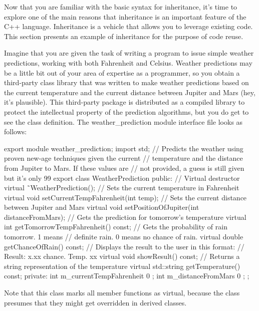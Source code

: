 
Now that you are familiar with the basic syntax for inheritance, it’s time to explore one of the main reasons that inheritance is an important feature of the C++ language. Inheritance is a vehicle that allows you to leverage existing code. This section presents an example of inheritance for the purpose of code reuse.


Imagine that you are given the task of writing a program to issue simple weather predictions, working with both Fahrenheit and Celsius. Weather predictions may be a little bit out of your area of expertise as a programmer, so you obtain a third-party class library that was written to make weather predictions based on the current temperature and the current distance between Jupiter and Mars (hey, it’s plausible). This third-party package is distributed as a compiled library to protect the intellectual property of the prediction algorithms, but you do get to see the class definition. The weather\_prediction module interface file looks as follows:

\begin{cpp}
export module weather_prediction;
import std;
// Predicts the weather using proven new-age techniques given the current
// temperature and the distance from Jupiter to Mars. If these values are
// not provided, a guess is still given but it's only 99%
export class WeatherPrediction
{
    public:
        // Virtual destructor
        virtual ˜WeatherPrediction();
        // Sets the current temperature in Fahrenheit
        virtual void setCurrentTempFahrenheit(int temp);
        // Sets the current distance between Jupiter and Mars
        virtual void setPositionOfJupiter(int distanceFromMars);
        // Gets the prediction for tomorrow's temperature
        virtual int getTomorrowTempFahrenheit() const;
        // Gets the probability of rain tomorrow. 1 means
        // definite rain. 0 means no chance of rain.
        virtual double getChanceOfRain() const;
        // Displays the result to the user in this format:
        // Result: x.xx chance. Temp. xx
        virtual void showResult() const;
        // Returns a string representation of the temperature
        virtual std::string getTemperature() const;
    private:
        int m_currentTempFahrenheit { 0 };
        int m_distanceFromMars { 0 };
};
\end{cpp}

Note that this class marks all member functions as virtual, because the class presumes that they might get overridden in derived classes.

